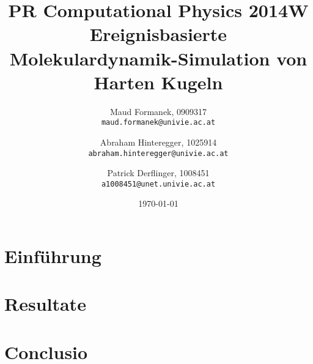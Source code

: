 \documentclass[a4paper]{article}
\title{PR Computational Physics 2014W \\ Ereignisbasierte Molekulardynamik-Simulation von Harten Kugeln}
\author{
	Maud Formanek, 0909317\\
    \texttt{maud.formanek@univie.ac.at}
	\and
    Abraham Hinteregger,  1025914\\
    \texttt{abraham.hinteregger@univie.ac.at}\and
    Patrick Derflinger,  1008451\\
    \texttt{a1008451@unet.univie.ac.at}
    }
\date{\today}
\begin{document}
\maketitle
\tableofcontents

\newpage

\section{Einführung} \label{einfuehrung}


\section{Resultate} \label{resultate}


\section{Conclusio} \label{conclusio}





\end{document}
